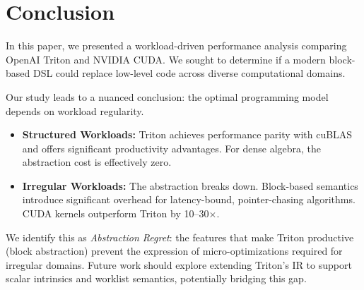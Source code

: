 \section{Conclusion}\label{sec:conclusion}

In this paper, we presented a workload-driven performance analysis comparing OpenAI Triton and NVIDIA CUDA. We sought to determine if a modern block-based DSL could replace low-level code across diverse computational domains.

Our study leads to a nuanced conclusion: the optimal programming model depends on workload regularity.
\begin{itemize}
    \item \textbf{Structured Workloads:} Triton achieves performance parity with cuBLAS and offers significant productivity advantages. For dense algebra, the abstraction cost is effectively zero.
    \item \textbf{Irregular Workloads:} The abstraction breaks down. Block-based semantics introduce significant overhead for latency-bound, pointer-chasing algorithms. CUDA kernels outperform Triton by 10--30$\times$.
\end{itemize}

We identify this as \textit{Abstraction Regret}: the features that make Triton productive (block abstraction) prevent the expression of micro-optimizations required for irregular domains.
Future work should explore extending Triton's IR to support scalar intrinsics and worklist semantics, potentially bridging this gap.
